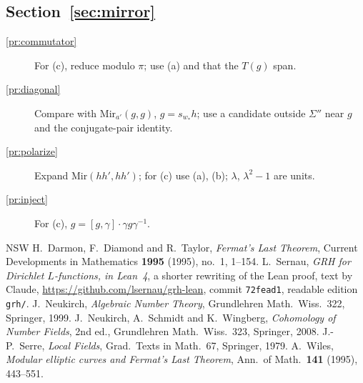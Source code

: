 \documentclass[reqno]{amsart}
\theoremstyle{definition}
\theoremstyle{plain}
\newcommand{\Mir}{\mathrm{Mir}}
\begin{document}
\subsection*{Section~\ref{sec:mirror}}
\begin{description}
\item[\ref{pr:commutator}] For (c), reduce modulo \(\pi\); use (a) and that the \(T(g)\) span.
\item[\ref{pr:diagonal}] Compare with \(\Mir_{a'}(g, g)\), \(g = s_{w_*}h\); use a candidate outside \(\Sigma''\) near \(g\) and the conjugate-pair identity.
\item[\ref{pr:polarize}] Expand \(\Mir(hh', hh')\); for (c) use (a), (b); \(\lambda\), \(\lambda^2 - 1\) are units.
\item[\ref{pr:inject}] For (c), \(g = [g, \gamma]\cdot\gamma g\gamma^{-1}\).
\end{description}

{\small
\begin{thebibliography}{NSW}
 H.~Darmon, F.~Diamond and R.~Taylor, \emph{Fermat's Last Theorem}, Current Developments in Mathematics \textbf{1995} (1995), no.~1, 1--154.
 L.~Sernau, \emph{GRH for Dirichlet \(L\)-functions, in Lean~4}, a shorter rewriting of the Lean proof, text by Claude, \url{https://github.com/lsernau/grh-lean}, commit \texttt{72fead1}, readable edition \texttt{grh/}.
 J.~Neukirch, \emph{Algebraic Number Theory}, Grundlehren Math.\ Wiss.\ 322, Springer, 1999.
 J.~Neukirch, A.~Schmidt and K.~Wingberg, \emph{Cohomology of Number Fields}, 2nd ed., Grundlehren Math.\ Wiss.\ 323, Springer, 2008.
 J.-P.~Serre, \emph{Local Fields}, Grad.\ Texts in Math.\ 67, Springer, 1979.
 A.~Wiles, \emph{Modular elliptic curves and Fermat's Last Theorem}, Ann.\ of Math.\ \textbf{141} (1995), 443--551.
\end{thebibliography}
}
\end{document}
